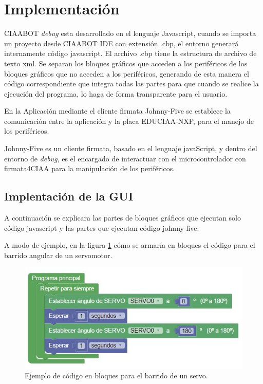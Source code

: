 \section{Implementación}
\label{sec:Modelo computacional}

CIAABOT \emph{debug} esta desarrollado en el lenguaje Javascript, cuando se importa un proyecto desde CIAABOT IDE con extensión .cbp, el entorno generará internamente código javascript. El archivo .cbp tiene la estructura de archivo de texto xml. Se separan los bloques gráficos que acceden a los periféricos de los bloques gráficos que no acceden a los periféricos, generando de esta manera el código correspondiente que integra todas las partes para que cuando se realice la ejecución del programa, lo haga de forma transparente para el usuario.

En la Aplicación mediante el cliente firmata Johnny-Five se establece la comunicación entre la aplicación y la placa EDUCIAA-NXP, para el manejo de los periféricos. 

Johnny-Five es un cliente firmata, basado en el lenguaje javaScript, y dentro del entorno de \emph{debug}, es el encargado de interactuar con el microcontrolador con firmata4CIAA para la manipulación de los periféricos.

\subsection{Implentación de la GUI}
\label{subsec:Implentación de la GUI}

A continuación se explicara las partes de bloques gráficos que ejecutan solo código javascript y las partes que ejecutan código johnny five.

A modo de ejemplo, en la figura \ref{fig:codigo-servo-bloques} cómo se armaría en bloques el código para el barrido angular de un servomotor.

\begin{figure}[!htbp]
	\centering
	\includegraphics[scale=.8]{./Figures/ejemplo-servo.jpg}
	\caption{Ejemplo de código en bloques para el barrido de un servo.}
	\label{fig:codigo-servo-bloques}
\end{figure}

